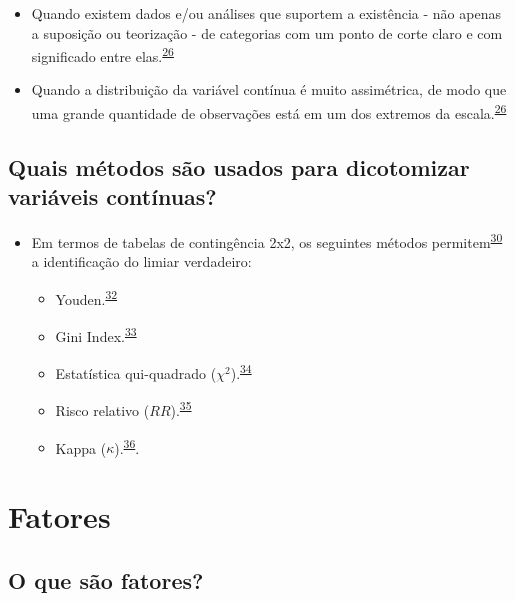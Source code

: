\documentclass[
]{book}
\begin{document}
\begin{itemize}
\item
  Quando existem dados e/ou análises que suportem a existência - não apenas a suposição ou teorização - de categorias com um ponto de corte claro e com significado entre elas.\textsuperscript{\protect\hyperlink{ref-MacCallum2002}{26}}
\item
  Quando a distribuição da variável contínua é muito assimétrica, de modo que uma grande quantidade de observações está em um dos extremos da escala.\textsuperscript{\protect\hyperlink{ref-MacCallum2002}{26}}
\end{itemize}

\hypertarget{quais-muxe9todos-suxe3o-usados-para-dicotomizar-variuxe1veis-contuxednuas}{%
\subsection{Quais métodos são usados para dicotomizar variáveis contínuas?}\label{quais-muxe9todos-suxe3o-usados-para-dicotomizar-variuxe1veis-contuxednuas}}

\begin{itemize}
\item
  Em termos de tabelas de contingência 2x2, os seguintes métodos permitem\textsuperscript{\protect\hyperlink{ref-Prince2017}{30}} a identificação do limiar verdadeiro:

  \begin{itemize}
  \item
    Youden.\textsuperscript{\protect\hyperlink{ref-YOUDEN1950}{32}}
  \item
    Gini Index.\textsuperscript{\protect\hyperlink{ref-strobl2007}{33}}
  \item
    Estatística qui-quadrado (\(\chi^2\)).\textsuperscript{\protect\hyperlink{ref-pearson1900}{34}}
  \item
    Risco relativo (\(RR\)).\textsuperscript{\protect\hyperlink{ref-Greiner2000}{35}}
  \item
    Kappa (\(\kappa\)).\textsuperscript{\protect\hyperlink{ref-fleiss1971}{36}}.
  \end{itemize}
\end{itemize}

\hypertarget{fatores}{%
\section{Fatores}\label{fatores}}

\hypertarget{o-que-suxe3o-fatores}{%
\subsection{O que são fatores?}\label{o-que-suxe3o-fatores}}
\end{document}
